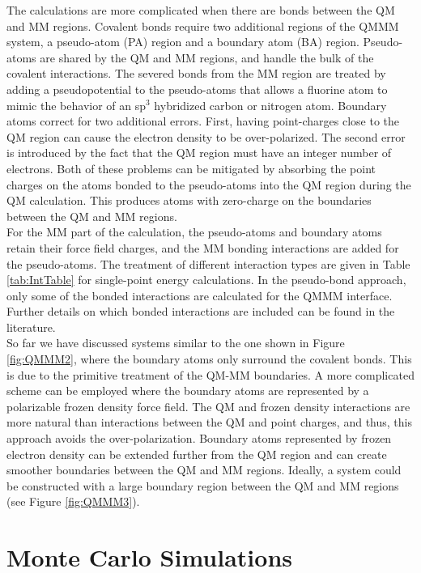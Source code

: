 \documentclass[12pt]{report}
\begin{document}
The calculations are more complicated when there are bonds between the QM and
MM regions. Covalent bonds require two additional regions of the QMMM system,
a pseudo-atom (PA) region and a boundary atom (BA) region. Pseudo-atoms are
shared by the QM and MM regions, and handle the bulk of the covalent
interactions. The severed bonds from the MM region are treated by adding a
pseudopotential to the pseudo-atoms that allows a fluorine atom to mimic the
behavior of an sp$^3$ hybridized carbon or nitrogen atom. Boundary atoms
correct for two additional errors. First, having point-charges close to the
QM region can cause the electron density to be over-polarized. The second
error is introduced by the fact that the QM region must have an integer number
of electrons. Both of these problems can be mitigated by absorbing the point
charges on the atoms bonded to the pseudo-atoms into the QM region during the
QM calculation. This produces atoms with zero-charge on the boundaries between
the QM and MM regions. \\

For the MM part of the calculation, the pseudo-atoms and boundary atoms retain
their force field charges, and the MM bonding interactions are added for the
pseudo-atoms. The treatment of different interaction types are given in Table
\ref{tab:IntTable} for single-point energy calculations. In the pseudo-bond
approach, only some of the bonded interactions are calculated for the QMMM
interface. Further details on which bonded interactions are included can be
found in the literature. \\

So far we have discussed systems similar to the one shown in Figure
\ref{fig:QMMM2}, where the boundary atoms only surround the covalent bonds.
This is due to the primitive treatment of the QM-MM boundaries. A more
complicated scheme can be employed where the boundary atoms are represented by
a polarizable frozen density force field. The QM and frozen density
interactions are more natural than interactions between the QM and point
charges, and thus, this approach avoids the over-polarization. Boundary atoms
represented by frozen electron density can be extended further from the QM
region and can create smoother boundaries between the QM and MM regions.
Ideally, a system could be constructed with a large boundary region between
the QM and MM regions (see Figure \ref{fig:QMMM3}).

\FloatBarrier

\section{Monte Carlo Simulations}
\end{document}
